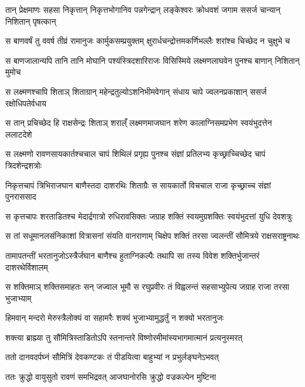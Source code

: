 \twolineshloka
{तान् प्रेक्षमाणः सहसा निकृत्तान् निकृत्तभोगानिव पन्नगेन्द्रान्}
{लङ्केश्वरः क्रोधवशं जगाम ससर्ज चान्यान् निशितान् पृषत्कान्} %

\twolineshloka
{स बाणवर्षं तु ववर्ष तीव्रं रामानुजः कार्मुकसम्प्रयुक्तम्}
{क्षुरार्धचन्द्रोत्तमकर्णिभल्लैः शरांश्च चिच्छेद न चुक्षुभे च} %

\twolineshloka
{स बाणजालान्यपि तानि तानि मोघानि पश्यंस्त्रिदशारिराजः}
{विसिस्मिये लक्ष्मणलाघवेन पुनश्च बाणान् निशितान् मुमोच} %

\twolineshloka
{स लक्ष्मणश्चापि शिताञ् शिताग्रान् महेन्द्रतुल्योऽशनिभीमवेगान्}
{संधाय चापे ज्वलनप्रकाशान् ससर्ज रक्षोधिपतेर्वधाय} %

\twolineshloka
{स तान् प्रचिच्छेद हि राक्षसेन्द्रः शिताञ् शराल्ँ लक्ष्मणमाजघान}
{शरेण कालाग्निसमप्रभेण स्वयंभुदत्तेन ललाटदेशे} %

\twolineshloka
{स लक्ष्मणो रावणसायकार्तश्चचाल चापं शिथिलं प्रगृह्य}
{पुनश्च संज्ञां प्रतिलभ्य कृच्छ्राच्चिच्छेद चापं त्रिदशेन्द्रशत्रोः} %

\twolineshloka
{निकृत्तचापं त्रिभिराजघान बाणैस्तदा दाशरथिः शिताग्रैः}
{स सायकार्तो विचचाल राजा कृच्छ्राच्च संज्ञां पुनराससाद} %

\twolineshloka
{स कृत्तचापः शरताडितश्च मेदार्द्रगात्रो रुधिरावसिक्तः}
{जग्राह शक्तिं स्वयमुग्रशक्तिः स्वयंभुदत्तां युधि देवशत्रुः} %

\twolineshloka
{स तां सधूमानलसंनिकाशां वित्रासनां संयति वानराणाम्}
{चिक्षेप शक्तिं तरसा ज्वलन्तीं सौमित्रये राक्षसराष्ट्रनाथः} %

\twolineshloka
{तामापतन्तीं भरतानुजोऽस्त्रैर्जघान बाणैश्च हुताग्निकल्पैः}
{तथापि सा तस्य विवेश शक्तिर्भुजान्तरं दाशरथेर्विशालम्} %

\twolineshloka
{स शक्तिमाञ् शक्तिसमाहतः सन् जज्वाल भूमौ स रघुप्रवीरः}
{तं विह्वलन्तं सहसाभ्युपेत्य जग्राह राजा तरसा भुजाभ्याम्} %

\twolineshloka
{हिमवान् मन्दरो मेरुस्त्रैलोक्यं वा सहामरैः}
{शक्यं भुजाभ्यामुद्धर्तुं न शक्यो भरतानुजः} %

\twolineshloka
{शक्त्या ब्राह्म्या तु सौमित्रिस्ताडितोऽपि स्तनान्तरे}
{विष्णोरमीमांस्यभागमात्मानं प्रत्यनुस्मरत्} %

\twolineshloka
{ततो दानवदर्पघ्नं सौमित्रिं देवकण्टकः}
{तं पीडयित्वा बाहुभ्यां न प्रभुर्लङ्घनेऽभवत्} %

\twolineshloka
{ततः क्रुद्धो वायुसुतो रावणं समभिद्रवत्}
{आजघानोरसि क्रुद्धो वज्रकल्पेन मुष्टिना} %

